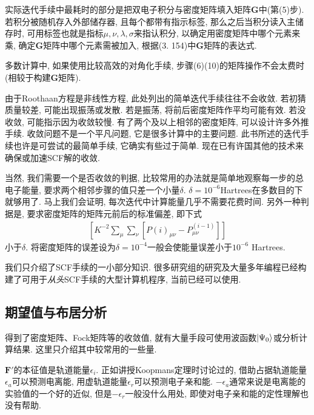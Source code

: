 实际迭代手续中最耗时的部分是把双电子积分与密度矩阵填入矩阵$\mathbf{G}$中(第(5)步). 
若积分被随机存入外部储存器, 
且每个都带有指示标签, 
那么之后当积分读入主储存时, 
可用标签也就是指标$\mu,\nu,\lambda,\sigma$来指认积分, 
以确定用密度矩阵中哪个元素来乘, 
确定$\mathbf{G}$矩阵中哪个元素需被加入, 
根据(3.
154)中$\mathbf{G}$矩阵的表达式.


多数计算中, 
如果使用比较高效的对角化手续, 
步骤(6)(10)的矩阵操作不会太费时(相较于构建$\mathbf{G}$矩阵).


由于Roothaan方程是非线性方程, 
此处列出的简单迭代手续往往不会收敛. 
若初猜质量较差, 
可能出现振荡或发散. 
若是振荡, 
将前后密度矩阵作平均可能有效. 
若没收敛, 
可能指示因为收敛较慢. 
有了两个及以上相邻的密度矩阵, 
可以设计许多外推手续. 
收敛问题不是一个平凡问题, 
它是很多计算中的主要问题. 
此书所述的迭代手续也许是可尝试的最简单手续, 
它确实有些过于简单. 
现在已有许国其他的技术来确保或加速SCF解的收敛.


当然, 
我们需要一个是否收敛的判据, 
比较常用的办法就是简单地观察每一步的总电子能量, 
要求两个相邻步骤的值只差一个小量$\delta$. 
$\delta=10^{-6}$Hartrees在多数目的下就够用了. 
马上我们会证明, 
每次迭代中计算能量几乎不需要花费时间. 
另外一种判据是, 
要求密度矩阵的矩阵元前后的标准偏差, 
即下式
\begin{align*}
	\left[ K^{-2}\sum_\mu\sum_\nu[P{(i)}_{\mu\nu}-P^{(i-1)}_{\mu\nu} ] \right]
\end{align*} 
小于$\delta$. 
将密度矩阵的误差设为$\delta=10^{-4}$一般会使能量误差小于$10^{-6}$ Hartrees.


我们只介绍了SCF手续的一小部分知识. 
很多研究组的研究及大量多年编程已经构建了可用于\emph{从头}SCF手续的大型计算机程序, 
当前已经可以使用.

\subsection{期望值与布居分析}
得到了密度矩阵、Fock矩阵等的收敛值, 
就有大量手段可使用波函数$\Ket{\Psi_0}$或分析计算结果. 
这里只介绍其中较常用的一些量.


$\mathbf{F'}$的本征值是轨道能量$\epsilon_i$. 
正如讲授Koopmans定理时讨论过的, 借助占据轨道能量$\epsilon_a$可以预测电离能, 用虚轨道能量$\epsilon_r$可以预测电子亲和能. $-\epsilon_a$通常来说是电离能的实验值的一个好的近似, 但是$-\epsilon_r$一般没什么用处, 即使对电子亲和能的定性理解也没有帮助.


